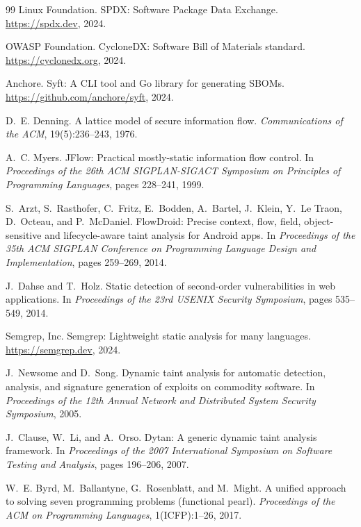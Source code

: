 \documentclass[11pt,twocolumn]{article}
\begin{document}
\begin{thebibliography}{99}
Linux Foundation.
\newblock SPDX: Software Package Data Exchange.
\newblock \url{https://spdx.dev}, 2024.

OWASP Foundation.
\newblock CycloneDX: Software Bill of Materials standard.
\newblock \url{https://cyclonedx.org}, 2024.

Anchore.
\newblock Syft: A CLI tool and Go library for generating SBOMs.
\newblock \url{https://github.com/anchore/syft}, 2024.

D.~E. Denning.
\newblock A lattice model of secure information flow.
\newblock \emph{Communications of the ACM}, 19(5):236--243, 1976.

A.~C. Myers.
\newblock JFlow: Practical mostly-static information flow control.
\newblock In \emph{Proceedings of the 26th ACM SIGPLAN-SIGACT Symposium on Principles of Programming Languages}, pages 228--241, 1999.

S.~Arzt, S.~Rasthofer, C.~Fritz, E.~Bodden, A.~Bartel, J.~Klein, Y.~Le Traon, D.~Octeau, and P.~McDaniel.
\newblock FlowDroid: Precise context, flow, field, object-sensitive and lifecycle-aware taint analysis for Android apps.
\newblock In \emph{Proceedings of the 35th ACM SIGPLAN Conference on Programming Language Design and Implementation}, pages 259--269, 2014.

J.~Dahse and T.~Holz.
\newblock Static detection of second-order vulnerabilities in web applications.
\newblock In \emph{Proceedings of the 23rd USENIX Security Symposium}, pages 535--549, 2014.

Semgrep, Inc.
\newblock Semgrep: Lightweight static analysis for many languages.
\newblock \url{https://semgrep.dev}, 2024.

J.~Newsome and D.~Song.
\newblock Dynamic taint analysis for automatic detection, analysis, and signature generation of exploits on commodity software.
\newblock In \emph{Proceedings of the 12th Annual Network and Distributed System Security Symposium}, 2005.

J.~Clause, W.~Li, and A.~Orso.
\newblock Dytan: A generic dynamic taint analysis framework.
\newblock In \emph{Proceedings of the 2007 International Symposium on Software Testing and Analysis}, pages 196--206, 2007.

W.~E. Byrd, M.~Ballantyne, G.~Rosenblatt, and M.~Might.
\newblock A unified approach to solving seven programming problems (functional pearl).
\newblock \emph{Proceedings of the ACM on Programming Languages}, 1(ICFP):1--26, 2017.


\end{thebibliography}
\end{document}
